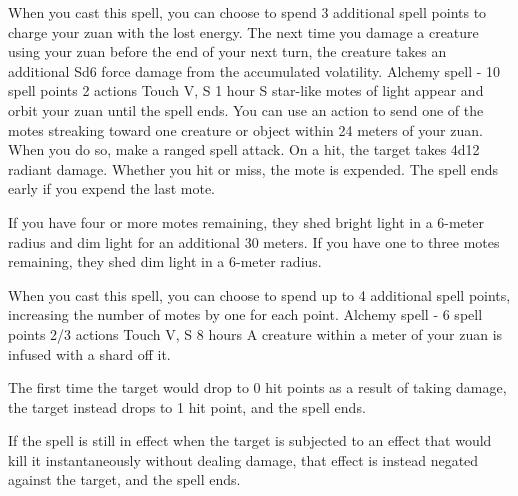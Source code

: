     When you cast this spell, you can choose to spend 3 additional spell points to charge your zuan with the lost energy.
    The next time you damage a creature using your zuan before the end of your next turn, the creature takes an additional Sd6 force damage from the accumulated volatility.
    {Alchemy spell - 10 spell points}
    {2 actions}
    {Touch}
    {V, S}
    {1 hour}
    S star-like motes of light appear and orbit your zuan until the spell ends.
    You can use an action to send one of the motes streaking toward one creature or object within 24 meters of your zuan.
    When you do so, make a ranged spell attack.
    On a hit, the target takes 4d12 radiant damage.
    Whether you hit or miss, the mote is expended.
    The spell ends early if you expend the last mote.

    If you have four or more motes remaining, they shed bright light in a 6-meter radius and dim light for an additional 30 meters.
    If you have one to three motes remaining, they shed dim light in a 6-meter radius.

    When you cast this spell, you can choose to spend up to 4 additional spell points, increasing the number of motes by one for each point.
    {Alchemy spell - 6 spell points}
    {2/3 actions}
    {Touch}
    {V, S}
    {8 hours}
    A creature within a meter of your zuan is infused with a shard off it.

    The first time the target would drop to 0 hit points as a result of taking damage, the target instead drops to 1 hit point, and the spell ends.

    If the spell is still in effect when the target is subjected to an effect that would kill it instantaneously without dealing damage, that effect is instead negated against the target, and the spell ends.

